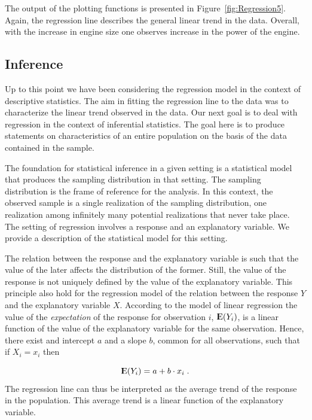 \documentclass[]{krantz}
\newcommand{\Expec}{{\rm I\kern-.3em E}}
\theoremstyle{definition}
\theoremstyle{definition}
\theoremstyle{definition}
\theoremstyle{remark}
\begin{document}
The output of the plotting functions is presented in
Figure~\ref{fig:Regression5}. Again, the regression line describes the
general linear trend in the data. Overall, with the increase in engine
size one observes increase in the power of the engine.

\hypertarget{subsec:Inference}{%
\subsection{Inference}\label{subsec:Inference}}

Up to this point we have been considering the regression model in the
context of descriptive statistics. The aim in fitting the regression
line to the data was to characterize the linear trend observed in the
data. Our next goal is to deal with regression in the context of
inferential statistics. The goal here is to produce statements on
characteristics of an entire population on the basis of the data
contained in the sample.

The foundation for statistical inference in a given setting is a
statistical model that produces the sampling distribution in that
setting. The sampling distribution is the frame of reference for the
analysis. In this context, the observed sample is a single realization
of the sampling distribution, one realization among infinitely many
potential realizations that never take place. The setting of regression
involves a response and an explanatory variable. We provide a
description of the statistical model for this setting.

The relation between the response and the explanatory variable is such
that the value of the later affects the distribution of the former.
Still, the value of the response is not uniquely defined by the value of
the explanatory variable. This principle also hold for the regression
model of the relation between the response \(Y\) and the explanatory
variable \(X\). According to the model of linear regression the value of
the \emph{expectation} of the response for observation \(i\), \(\Expec(Y_i)\), is
a linear function of the value of the explanatory variable for the same
observation. Hence, there exist and intercept \(a\) and a slope \(b\),
common for all observations, such that if \(X_i = x_i\) then

\[\Expec(Y_i) = a + b \cdot x_i\;.\] The regression line can thus be
interpreted as the average trend of the response in the population. This
average trend is a linear function of the explanatory variable.
\end{document}
